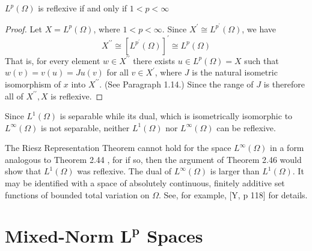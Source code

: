 \begin{theorem}
  $L^p(\Omega)$ is reflexive if and only if $1<p<\infty$
\end{theorem}

\begin{proof}
  Let $X=L^p(\Omega)$, where $1<p<\infty$. Since $X^{\prime} \cong L^{p^{\prime}}(\Omega)$, we have
  \[
  X^{\prime \prime} \cong\left[L^{p^{\prime}}(\Omega)\right]^{\prime} \cong L^p(\Omega)
  \]
  That is, for every element $w \in X^{\prime \prime}$ there exists $u \in L^p(\Omega)=X$ such that $w(v)=v(u)=J u(v)$ for all $v \in X^{\prime}$, where $J$ is the natural isometric isomorphism of $x$ into $X^{\prime \prime}$. (See Paragraph 1.14.) Since the range of $J$ is therefore all of $X^{\prime \prime}, X$ is reflexive.
\end{proof}

Since $L^1(\Omega)$ is separable while its dual, which is isometrically isomorphic to $L^{\infty}(\Omega)$ is not separable, neither $L^1(\Omega)$ nor $L^{\infty}(\Omega)$ can be reflexive.

\begin{para}
  The Riesz Representation Theorem cannot hold for the space $L^{\infty}(\Omega)$ in a form analogous to Theorem 2.44 , for if so, then the argument of Theorem 2.46 would show that $L^1(\Omega)$ was reflexive. The dual of $L^{\infty}(\Omega)$ is larger than $L^1(\Omega)$. It may be identified with a space of absolutely continuous, finitely additive set functions of bounded total variation on $\Omega$. See, for example, [Y, p 118] for details.
\end{para}


\section[Mixed-Norm \texorpdfstring{$L^p$}{L\textasciicircum p} Spaces]{Mixed-Norm $\bm{L^p}$ Spaces}

